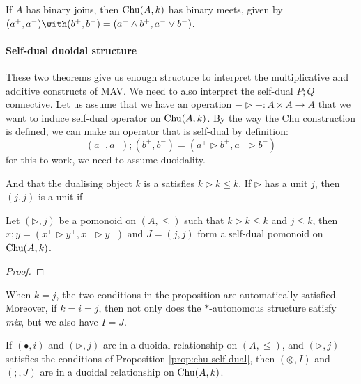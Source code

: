 \begin{proposition}
  If $A$ has binary joins, then $\mathrm{Chu}(A, k)$ has binary meets, given
  by $(a^+,a^-) \with (b^+,b^-) = (a^+ \land b^+, a^- \lor b^-)$.
\end{proposition}

\paragraph{Self-dual duoidal structure}
These two theorems give us enough structure to interpret the
multiplicative and additive constructs of MAV. We need to also
interpret the self-dual $P; Q$ connective. Let us assume that we have
an operation $-\rhd- : A \times A \to A$ that we want to induce
self-dual operator on $\mathrm{Chu}(A, k)$. By the way the Chu construction is
defined, we can make an operator that is self-dual by definition:
\begin{displaymath}
  (a^+, a^-) ; (b^+, b^-) = (a^+ \rhd b^+, a^- \rhd b^-)
\end{displaymath}
for this to work, we need to assume duoidality.

And that the dualising object $k$ is a
satisfies $k \rhd k \leq k$. If $\rhd$ has a unit $j$, then $(j, j)$ is a unit if

\begin{proposition}\label{prop:chu-self-dual}
  Let $(\rhd, j)$ be a pomonoid on $(A, \leq)$ such that
  $k \rhd k \leq k$ and $j \leq k$, then
  $x ; y = (x^+ \rhd y^+, x^- \rhd y^-)$ and $J = (j, j)$ form a
  self-dual pomonoid on $\mathrm{Chu}(A, k)$.
\end{proposition}

\begin{proof}
\end{proof}

\begin{remark}
  When $k = j$, the two conditions in the proposition are
  automatically satisfied. Moreover, if $k = i = j$, then not only
  does the $*$-autonomous structure satisfy \emph{mix}, but we also
  have $I =J$.
\end{remark}

\begin{proposition}
  If $(\bullet, i)$ and $(\rhd, j)$ are in a duoidal relationship on
  $(A, \leq)$, and $(\rhd, j)$ satisfies the conditions of Proposition
  \ref{prop:chu-self-dual}, then $(\otimes, I)$ and $(;, J)$ are in a
  duoidal relationship on $\mathrm{Chu}(A, k)$.
\end{proposition}

